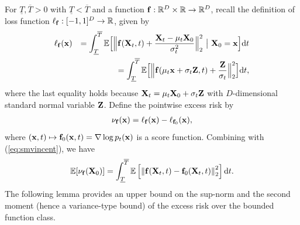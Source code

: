 \documentclass[twoside,11pt]{article}
\def\cF{\mathcal F}
\def\cL{\mathcal L}
\def\cP{\mathcal P}
\newcommand{\bd}{{\bf d}}
\newcommand{\bff}{{\bf f}}
\newcommand{\bfm}{{\bf m}}
\newcommand{\bx}{{\bf x}}
\newcommand{\bX}{{\bf X}}
\newcommand{\bZ}{{\bf Z}}
\newcommand{\bbE}{{\mathbb E}}
\newcommand{\bbR}{{\mathbb R}}
\newcommand{\bean}{\setlength\arraycolsep{1pt}\begin{eqnarray*}}
\newcommand{\eean}{\end{eqnarray*}}
\def\d{{\rm d}}
\begin{document}

For $\underline{T}, \overline{T} > 0$ with $\underline{T} < \overline{T}$ and a function $\bff : \bbR^{D} \times \bbR \rightarrow \bbR^{D}$, recall the definition of loss function $\ell_{\bff} : [-1,1]^{D} \rightarrow \bbR$, given by
\bean
\ell_{\bff}(\bx) && = \int_{\underline{T}}^{\overline{T}} \bbE \Big[ \Big\| \bff(\bX_{t}, t) + \frac{\bX_t - \mu_t \bX_0}{\sigma_t^2} \Big\|_2^2 ~ \big| ~ \bX_0 = \bx \Big]\d t
\\
&& = \int_{\underline{T}}^{\overline{T}} \bbE \Big[ \Big\| \bff(\mu_t \bx+ \sigma_t \bZ, t) + \frac{\bZ}{\sigma_t} \Big\|_2^2 \Big]\d t,
\eean
where the last equality holds because $\bX_{t} = \mu_t \bX_{0} + \sigma_{t} \bZ$ with $D$-dimensional standard normal variable $\bZ$.
Define the pointwise excess risk by
\bean
\nu_{\bff}(\bx) = \ell_{\bff}(\bx) - \ell_{\bff_0}(\bx),
\eean
where $(\bx,t) \mapsto \bff_0(\bx,t) = \nabla \log p_t(\bx)$ is a score function.
Combining with (\ref{eq:smvincent}), we have
\bean
\bbE[ \nu_{\bff} (\bX_0) ] = \int_{\underline{T}}^{\overline{T}} \bbE \left[ \left\| \bff(\bX_t,t) - \bff_0(\bX_t,t) \right\|_2^2 \right] \d t.
\eean
The following lemma provides an upper bound on the sup-norm and the second moment (hence a variance-type bound) of the excess risk over the bounded function class.
\end{document}
